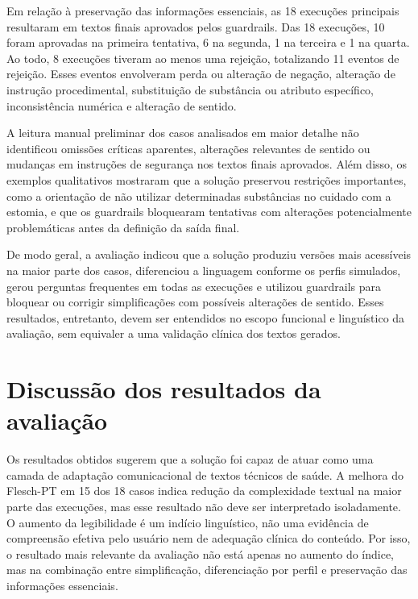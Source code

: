 Em relação à preservação das informações essenciais, as 18 execuções principais resultaram em textos finais aprovados pelos guardrails. Das 18 execuções, 10 foram aprovadas na primeira tentativa, 6 na segunda, 1 na terceira e 1 na quarta. Ao todo, 8 execuções tiveram ao menos uma rejeição, totalizando 11 eventos de rejeição. Esses eventos envolveram perda ou alteração de negação, alteração de instrução procedimental, substituição de substância ou atributo específico, inconsistência numérica e alteração de sentido.

A leitura manual preliminar dos casos analisados em maior detalhe não identificou omissões críticas aparentes, alterações relevantes de sentido ou mudanças em instruções de segurança nos textos finais aprovados. Além disso, os exemplos qualitativos mostraram que a solução preservou restrições importantes, como a orientação de não utilizar determinadas substâncias no cuidado com a estomia, e que os guardrails bloquearam tentativas com alterações potencialmente problemáticas antes da definição da saída final.

De modo geral, a avaliação indicou que a solução produziu versões mais acessíveis na maior parte dos casos, diferenciou a linguagem conforme os perfis simulados, gerou perguntas frequentes em todas as execuções e utilizou guardrails para bloquear ou corrigir simplificações com possíveis alterações de sentido. Esses resultados, entretanto, devem ser entendidos no escopo funcional e linguístico da avaliação, sem equivaler a uma validação clínica dos textos gerados.

\section{Discussão dos resultados da avaliação}
\label{sec:discussao-resultados-avaliacao}

Os resultados obtidos sugerem que a solução foi capaz de atuar como uma camada de adaptação comunicacional de textos técnicos de saúde. A melhora do Flesch-PT em 15 dos 18 casos indica redução da complexidade textual na maior parte das execuções, mas esse resultado não deve ser interpretado isoladamente. O aumento da legibilidade é um indício linguístico, não uma evidência de compreensão efetiva pelo usuário nem de adequação clínica do conteúdo. Por isso, o resultado mais relevante da avaliação não está apenas no aumento do índice, mas na combinação entre simplificação, diferenciação por perfil e preservação das informações essenciais.

